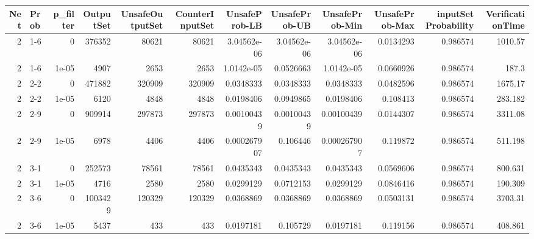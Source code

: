\begin{tabular}{rlrrrrrrrrrr}
\hline
   Net & Prob   &   p\_filter &   OutputSet &   UnsafeOutputSet &   CounterInputSet &   UnsafeProb-LB &   UnsafeProb-UB &   UnsafeProb-Min &   UnsafeProb-Max &   inputSet Probability &   VerificationTime \\
\hline
     2 & 1-6    &      0     &      376352 &             80621 &             80621 &     3.04562e-06 &     3.04562e-06 &      3.04562e-06 &        0.0134293 &               0.986574 &         1010.57    \\
     2 & 1-6    &      1e-05 &        4907 &              2653 &              2653 &     1.0142e-05  &     0.0526663   &      1.0142e-05  &        0.0660926 &               0.986574 &          187.3     \\
     2 & 2-2    &      0     &      471882 &            320909 &            320909 &     0.0348333   &     0.0348333   &      0.0348333   &        0.0482596 &               0.986574 &         1675.17    \\
     2 & 2-2    &      1e-05 &        6120 &              4848 &              4848 &     0.0198406   &     0.0949865   &      0.0198406   &        0.108413  &               0.986574 &          283.182   \\
     2 & 2-9    &      0     &      909914 &            297873 &            297873 &     0.00100439  &     0.00100439  &      0.00100439  &        0.0144307 &               0.986574 &         3311.08    \\
     2 & 2-9    &      1e-05 &        6978 &              4406 &              4406 &     0.000267907 &     0.106446    &      0.000267907 &        0.119872  &               0.986574 &          511.198   \\
     2 & 3-1    &      0     &      252573 &             78561 &             78561 &     0.0435343   &     0.0435343   &      0.0435343   &        0.0569606 &               0.986574 &          800.631   \\
     2 & 3-1    &      1e-05 &        4716 &              2580 &              2580 &     0.0299129   &     0.0712153   &      0.0299129   &        0.0846416 &               0.986574 &          190.309   \\
     2 & 3-6    &      0     &     1003429 &            120329 &            120329 &     0.0368869   &     0.0368869   &      0.0368869   &        0.0503131 &               0.986574 &         3703.31    \\
     2 & 3-6    &      1e-05 &        5437 &               433 &               433 &     0.0197181   &     0.105729    &      0.0197181   &        0.119156  &               0.986574 &          408.861   \\

\end{tabular}
